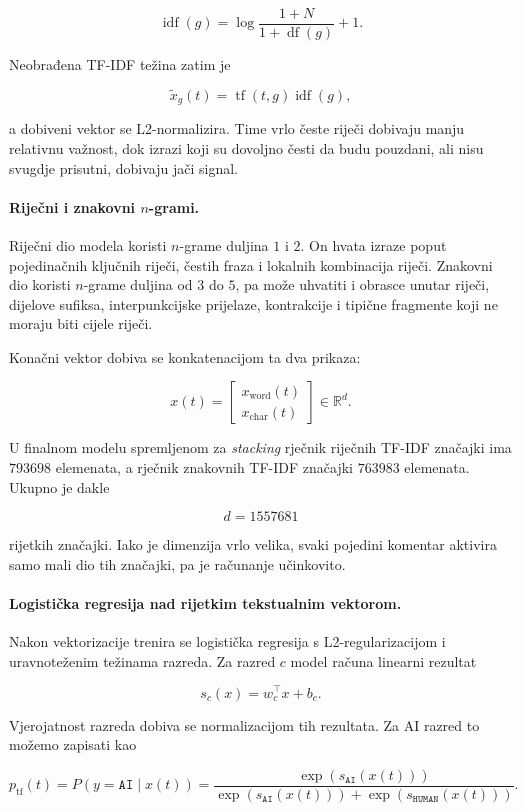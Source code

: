 \documentclass{article}
\begin{document}
\[
\operatorname{idf}(g)=\log\frac{1+N}{1+\operatorname{df}(g)}+1.
\]

Neobrađena TF-IDF težina zatim je

\[
\tilde x_g(t)=\operatorname{tf}(t,g)\operatorname{idf}(g),
\]

a dobiveni vektor se L2-normalizira. Time vrlo česte riječi dobivaju manju relativnu važnost, dok izrazi koji su dovoljno česti da budu pouzdani, ali nisu svugdje prisutni, dobivaju jači signal.

\paragraph{Riječni i znakovni $n$-grami.}
Riječni dio modela koristi $n$-grame duljina $1$ i $2$. On hvata izraze poput pojedinačnih ključnih riječi, čestih fraza i lokalnih kombinacija riječi. Znakovni dio koristi $n$-grame duljina od $3$ do $5$, pa može uhvatiti i obrasce unutar riječi, dijelove sufiksa, interpunkcijske prijelaze, kontrakcije i tipične fragmente koji ne moraju biti cijele riječi.

Konačni vektor dobiva se konkatenacijom ta dva prikaza:

\[
x(t)=
\begin{bmatrix}
x_{\mathrm{word}}(t)\\
x_{\mathrm{char}}(t)
\end{bmatrix}
\in\mathbb{R}^{d}.
\]

U finalnom modelu spremljenom za \textit{stacking} rječnik riječnih TF-IDF značajki ima $793698$ elemenata, a rječnik znakovnih TF-IDF značajki $763983$ elemenata. Ukupno je dakle

\[
d=1557681
\]

rijetkih značajki. Iako je dimenzija vrlo velika, svaki pojedini komentar aktivira samo mali dio tih značajki, pa je računanje učinkovito.

\paragraph{Logistička regresija nad rijetkim tekstualnim vektorom.}
Nakon vektorizacije trenira se logistička regresija s L2-regularizacijom i uravnoteženim težinama razreda. Za razred $c$ model računa linearni rezultat

\[
s_c(x)=w_c^\top x+b_c.
\]

Vjerojatnost razreda dobiva se normalizacijom tih rezultata. Za AI razred to možemo zapisati kao

\[
p_{\mathrm{tf}}(t)
=P(y=\texttt{AI}\mid x(t))
=\frac{\exp(s_{\texttt{AI}}(x(t)))}{\exp(s_{\texttt{AI}}(x(t)))+\exp(s_{\texttt{HUMAN}}(x(t)))}.
\]
\end{document}
